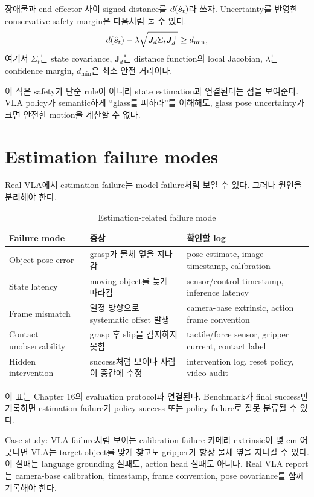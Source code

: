 장애물과 end-effector 사이 signed distance를 $d(\hat{\bm{s}}_t)$라 쓰자. Uncertainty를 반영한 conservative safety margin은 다음처럼 둘 수 있다.
\begin{equation}
  d(\hat{\bm{s}}_t) - \lambda \sqrt{\bm{J}_d \Sigma_t \bm{J}_d^\top} \ge d_{\min},
  \label{eq:uncertainty-safety}
\end{equation}
여기서 $\Sigma_t$는 state covariance, $\bm{J}_d$는 distance function의 local Jacobian, $\lambda$는 confidence margin, $d_{\min}$은 최소 안전 거리이다.

이 식은 safety가 단순 rule이 아니라 state estimation과 연결된다는 점을 보여준다. VLA policy가 semantic하게 ``glass를 피하라''를 이해해도, glass pose uncertainty가 크면 안전한 motion을 계산할 수 없다.

\section{Estimation failure modes}

Real VLA에서 estimation failure는 model failure처럼 보일 수 있다. 그러나 원인을 분리해야 한다.

\begin{table}[ht]
\centering
\caption{Estimation-related failure mode}
\label{tab:estimation-failure}
\small
\begin{tabularx}{\textwidth}{p{32mm}X X}
\toprule
Failure mode & 증상 & 확인할 log \\
\midrule
Object pose error & grasp가 물체 옆을 지나감 & pose estimate, image timestamp, calibration \\
State latency & moving object를 늦게 따라감 & sensor/control timestamp, inference latency \\
Frame mismatch & 일정 방향으로 systematic offset 발생 & camera-base extrinsic, action frame convention \\
Contact unobservability & grasp 후 slip을 감지하지 못함 & tactile/force sensor, gripper current, contact label \\
Hidden intervention & success처럼 보이나 사람이 중간에 수정 & intervention log, reset policy, video audit \\
\bottomrule
\end{tabularx}
\end{table}

이 표는 Chapter 16의 evaluation protocol과 연결된다. Benchmark가 final success만 기록하면 estimation failure가 policy success 또는 policy failure로 잘못 분류될 수 있다.

\begin{casebox}{Case study: VLA failure처럼 보이는 calibration failure}
카메라 extrinsic이 몇 cm 어긋나면 VLA는 target object를 맞게 찾고도 gripper가 항상 물체 옆을 지나갈 수 있다. 이 실패는 language grounding 실패도, action head 실패도 아니다. Real VLA report는 camera-base calibration, timestamp, frame convention, pose covariance를 함께 기록해야 한다.
\end{casebox}

